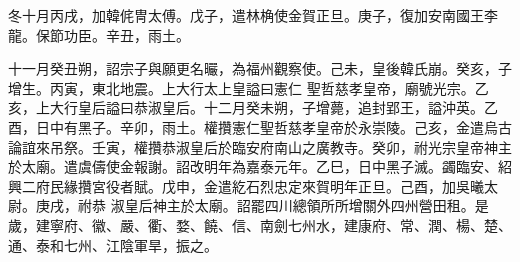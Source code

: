 \begin{pinyinscope}
 冬十月丙戌，加韓侂冑太傅。戊子，遣林桷使金賀正旦。庚子，復加安南國王李龍。保節功臣。辛丑，雨土。



 十一月癸丑朔，詔宗子與願更名曮，為福州觀察使。己未，皇後韓氏崩。癸亥，子增生。丙寅，東北地震。上大行太上皇謚曰憲仁
 聖哲慈孝皇帝，廟號光宗。乙亥，上大行皇后謚曰恭淑皇后。十二月癸未朔，子增薨，追封郢王，謚沖英。乙酉，日中有黑子。辛卯，雨土。權攢憲仁聖哲慈孝皇帝於永崇陵。己亥，金遣烏古論誼來吊祭。壬寅，權攢恭淑皇后於臨安府南山之廣教寺。癸卯，祔光宗皇帝神主於太廟。遣虞儔使金報謝。詔改明年為嘉泰元年。乙巳，日中黑子滅。蠲臨安、紹興二府民緣攢宮役者賦。戊申，金遣紇石烈忠定來賀明年正旦。己酉，加吳曦太尉。庚戌，祔恭
 淑皇后神主於太廟。詔罷四川總領所所增關外四州營田租。是歲，建寧府、徽、嚴、衢、婺、饒、信、南劍七州水，建康府、常、潤、楊、楚、通、泰和七州、江陰軍旱，振之。



\end{pinyinscope}